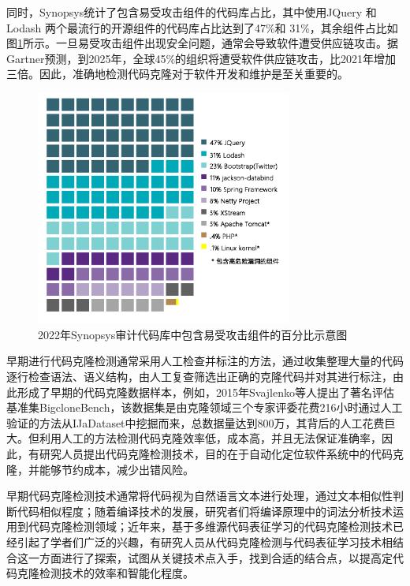 同时，Synopsys统计了包含易受攻击组件的代码库占比，其中使用JQuery 和 Lodash 两个最流行的开源组件的代码库占比达到了47\%和 31\%，其余组件占比如图\ref{fig:assembly}所示。一旦易受攻击组件出现安全问题，通常会导致软件遭受供应链攻击。据Gartner\cite{Gartner_2022}预测，到2025年，全球45\%的组织将遭受软件供应链攻击，比2021年增加三倍。因此，准确地检测代码克隆对于软件开发和维护是至关重要的。
\begin{figure}[H]
    \centering
    \includegraphics[width=0.75\textwidth]{figures/assembly}
    \caption{2022年Synopsys审计代码库中包含易受攻击组件的百分比示意图}
    \label{fig:assembly}
\end{figure}

早期进行代码克隆检测通常采用人工检查并标注的方法，通过收集整理大量的代码逐行检查语法、语义结构，由人工复查筛选出正确的克隆代码并对其进行标注，由此形成了早期的代码克隆数据样本，例如，2015年Svajlenko\cite{7332459}等人提出了著名评估基准集BigcloneBench，该数据集是由克隆领域三个专家评委花费216小时通过人工验证的方法从IJaDataset\cite{IJaDataset2.0}中挖掘而来，总数据量达到800万，其背后的人工花费巨大。但利用人工的方法检测代码克隆效率低，成本高，并且无法保证准确率\cite{7965429}，因此，有研究人员提出代码克隆检测技术，目的在于自动化定位软件系统中的代码克隆，并能够节约成本，减少出错风险\cite{Yang2015ClassificationMF}。

早期代码克隆检测技术通常将代码视为自然语言文本进行处理，通过文本相似性判断代码相似程度；随着编译技术的发展，研究者们将编译原理中的词法分析技术运用到代码克隆检测领域；近年来，基于多维源代码表征学习的代码克隆检测技术已经引起了学者们广泛的兴趣，有研究人员从代码克隆检测与代码表征学习技术相结合这一方面进行了探索，试图从关键技术点入手，找到合适的结合点，以提高定代码克隆检测技术的效率和智能化程度。


